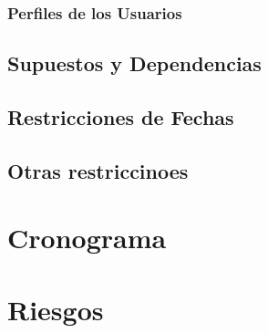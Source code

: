 \documentclass{article}
\begin{document}
\subsubsection{Perfiles de los Usuarios}
\subsection{Supuestos y Dependencias}
\subsection{Restricciones de Fechas}
\subsection{Otras restriccinoes}
\newpage
\section{Cronograma}
\newpage
\section{Riesgos}
\end{document}
